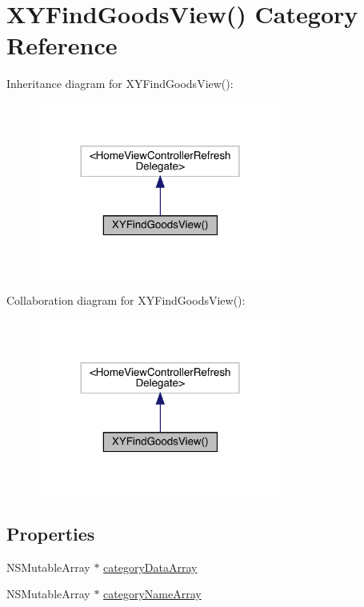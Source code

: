 \hypertarget{category_x_y_find_goods_view_07_08}{}\section{X\+Y\+Find\+Goods\+View() Category Reference}
\label{category_x_y_find_goods_view_07_08}


Inheritance diagram for X\+Y\+Find\+Goods\+View()\+:\nopagebreak
\begin{figure}[H]
\begin{center}
\leavevmode
\includegraphics[width=228pt]{category_x_y_find_goods_view_07_08__inherit__graph}
\end{center}
\end{figure}


Collaboration diagram for X\+Y\+Find\+Goods\+View()\+:\nopagebreak
\begin{figure}[H]
\begin{center}
\leavevmode
\includegraphics[width=228pt]{category_x_y_find_goods_view_07_08__coll__graph}
\end{center}
\end{figure}
\subsection*{Properties}
\begin{DoxyCompactItemize}
\item 
N\+S\+Mutable\+Array $\ast$ \mbox{\hyperlink{category_x_y_find_goods_view_07_08_ae211779cebd7da4560d5ba78739cb9f2}{category\+Data\+Array}}
\item 
N\+S\+Mutable\+Array $\ast$ \mbox{\hyperlink{category_x_y_find_goods_view_07_08_a71c2d4fbb2831ba1ccc871bbd2541b1c}{category\+Name\+Array}}
\end{DoxyCompactItemize}


